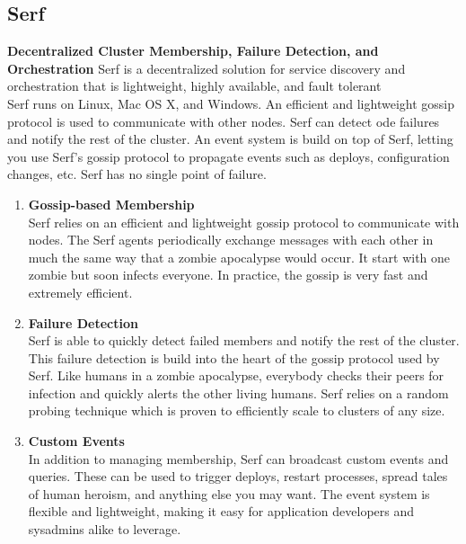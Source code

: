 \documentclass[12pt, oneside]{article}
\begin{document}
	\subsection{Serf}
	\textbf{Decentralized Cluster Membership, Failure Detection, and Orchestration}
	Serf is a decentralized solution for service discovery and orchestration that is lightweight, highly available, and fault tolerant \\
	Serf runs on Linux, Mac OS X, and Windows. An efficient and lightweight gossip protocol is used to communicate with other nodes. Serf can detect ode failures and notify the rest of the cluster. An event system is build on top of Serf, letting you use Serf's gossip protocol to propagate events such as deploys, configuration changes, etc. Serf has no single point of failure. 
	\begin{enumerate}
	\item \textbf{Gossip-based Membership} \\
	Serf relies on an efficient and lightweight gossip protocol to communicate with nodes. The Serf agents periodically exchange messages with each other in much the same way that a zombie apocalypse would occur. It start with one zombie but soon infects everyone. In practice, the gossip is very fast and extremely efficient. 
	\item \textbf{Failure Detection} \\
	Serf is able to quickly detect failed members and notify the rest of the cluster. This failure detection is build into the heart of the gossip protocol used by Serf. Like humans in a zombie apocalypse, everybody checks their peers for infection and quickly alerts the other living humans. Serf relies on a random probing technique which is proven to efficiently scale to clusters of any size.
	\item \textbf{Custom Events} \\
	In addition to managing membership, Serf can broadcast custom events and queries. These can be used to trigger deploys, restart processes, spread tales of human heroism, and anything else you may want. The event system is flexible and lightweight, making it easy for application developers and sysadmins alike to leverage. 
	\end{enumerate}
	
	
	
\end{document}
